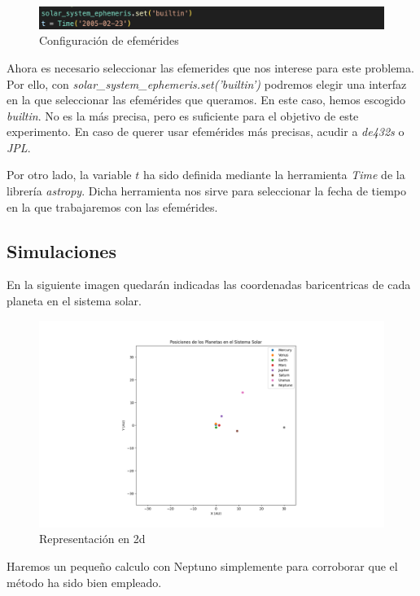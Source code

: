 \documentclass[12pt]{article}
\begin{document}
\begin{figure}[!h]
    \centering
    \includegraphics[scale=0.6]{efemerides.png}
    \caption{Configuración de efemérides}
    \label{im2}
\end{figure}

Ahora es necesario seleccionar las efemerides que nos interese para este problema.
Por ello, con \textit{solar\_system\_ephemeris.set('builtin')} 
podremos elegir una interfaz en la que seleccionar las efemérides que queramos. En este caso, hemos escogido \textit{builtin}. 
No es la más precisa, pero es suficiente para el objetivo de este experimento. En caso de querer usar efemérides más precisas, 
acudir a \textit{de432s} o \textit{JPL}.

\vspace{5mm}
Por otro lado, la variable $t$ ha sido definida mediante la herramienta \textit{Time} de la librería \textit{astropy}. Dicha
herramienta nos sirve para seleccionar la fecha de tiempo en la que trabajaremos con las efemérides.


\subsection{Simulaciones}
En la siguiente imagen quedarán indicadas las coordenadas baricentricas de cada planeta en el sistema solar.

\begin{figure}[!h]
    \centering
    \includegraphics[scale=0.4]{2d.png}
    \caption{Representación en 2d}
    \label{im3}
\end{figure}


Haremos un pequeño calculo con Neptuno simplemente para corroborar que el método ha sido bien empleado.
\end{document}

